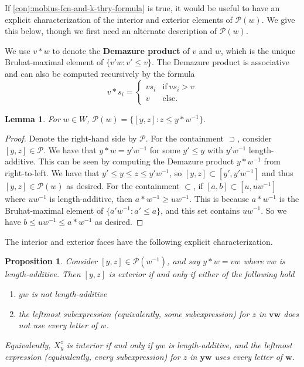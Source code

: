 \documentclass[11pt]{amsart}
\newtheorem{lemma}[Thm]{Lemma}
\newtheorem{proposition}[Thm]{Proposition}
\theoremstyle{definition}
\newcommand\defn[1]{{\bf #1}}
\def\bw{\mathbf{w}}
\def\bv{\mathbf{v}}
\def\calP{\mathcal{P}}
\begin{document}
If \cref{conj:mobius-fcn-and-k-thry-formula} is true, it would be useful to have an explicit characterization of the interior and exterior elements of $\calP(w)$. We give this below, though we first need an alternate description of $\calP(w)$.
 
 We use $v*w$ to denote the \defn{Demazure product} of $v$ and $w$, which is the unique Bruhat-maximal element of $\{v'w: v' \leq v\}$. The Demazure product is associative and can also be computed recursively by the formula
 \[v * s_i = \begin{cases}
 		v s_i & \text{if}~ vs_i > v\\
 		v & \text{else}.
 	\end{cases}\]
 

\begin{lemma}\label{lem:interval-poset-Demazure-prod}
For $w \in W$, $\calP(w)= \{[y,z]: z \leq y * w^{-1}\}.$
\end{lemma}
\begin{proof} Denote the right-hand side by $\calP$.
For the containment $\supset$, consider $[y,z] \in \calP$. We have that $y * w= y' w^{-1}$ for some $y' \leq y$ with $y' w^{-1}$ length-additive. This can be seen by computing the Demazure product $y*w^{-1}$ from right-to-left. We have that $y' \leq y \leq z \leq y'w^{-1}$, so $[y,z] \subset [y', y'w^{-1}]$ and thus $[y,z] \in \calP(w)$ as desired. For the containment $\subset$, if $[a,b] \subset [u, uw^{-1}]$ where $uw^{-1}$ is length-additive, then $a*w^{-1} \geq uw^{-1}$. This is because $a*w^{-1}$ is the Bruhat-maximal element of $\{a'w^{-1}: a' \leq a\}$, and this set contains $uw^{-1}$. So we have $b \leq uw^{-1} \leq a*w^{-1}$ as desired.
\end{proof}

The interior and exterior faces have the following explicit characterization.

\begin{proposition}
	Consider $[y,z] \in \calP(w^{-1})$, and say $y * w = vw$ where $vw$ is length-additive. Then $[y,z]$ is exterior if and only if either of the following hold
	\begin{enumerate}
		\item $yw$ is not length-additive 
		\item the leftmost subexpression (equivalently, some subexpression) for $z$ in $\bv \bw$ does not use every letter of $w$.
	\end{enumerate}
	
	Equivalently, $X_y^z$ is interior if and only if $yw$ is length-additive, and the leftmost expression (equivalently, every subexpression) for $z$ in $\mathbf{y} \bw$ uses every letter of $\bw$.
\end{proposition}
\end{document}
